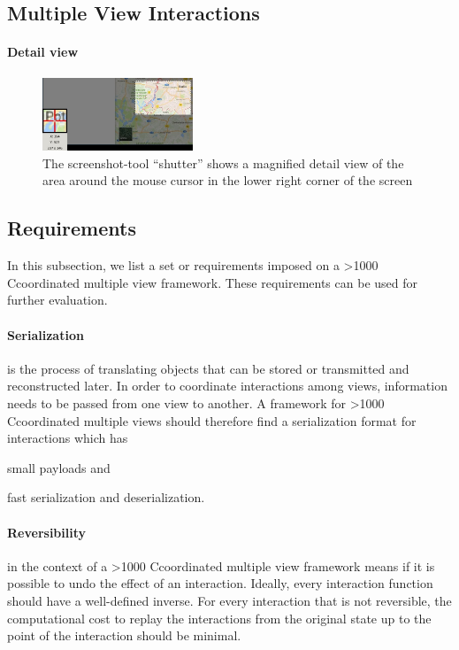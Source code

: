\documentclass{article}
\newcommand\hmm[1]{\ifnum\ifhmode\spacefactor\else2000\fi>1000 \uppercase{#1}\else#1\fi}
\newcommand{\cmv}{\hmm{c}oordinated multiple view}
\newcommand{\cmvs}{\hmm{c}oordinated multiple views}
\begin{document}
\subsection{Multiple View Interactions}\label{sec:analysis:examples}

\paragraph{Detail view}
\begin{figure}
  \centering
  \includegraphics[width=0.4\textwidth]{images/chartTypes/multi/detail-view}
  \caption{The screenshot-tool ``shutter'' shows a magnified detail view of the area around the mouse cursor in the lower right corner of the screen}\label{fig:concept:chart-types:detail}
\end{figure}

\subsection{Requirements}
In this subsection, we list a set or requirements imposed on a \cmv{} framework.
These requirements can be used for further evaluation.
\paragraph{Serialization} is the process of translating objects that can be stored or transmitted and reconstructed later.
In order to coordinate interactions among views, information needs to be passed from one view to another. 
A framework for \cmvs{} should therefore find a serialization format for interactions which has
\begin{enumerate*}[label=(\arabic*)]
  \item
    small payloads and
  \item 
    fast serialization and deserialization.
\end{enumerate*}

\paragraph{Reversibility} in the context of a \cmv{} framework means if it is possible to undo the effect of an interaction.
Ideally, every interaction function should have a well-defined inverse.
For every interaction that is not reversible, the computational cost to replay the interactions from the original state up to the point of the interaction should be minimal.
\end{document}

